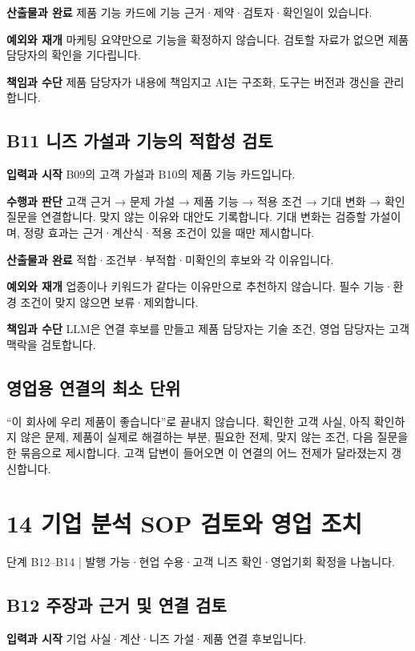 \documentclass[a4paper,10pt]{article}
\begin{document}
\noindent\textbf{산출물과 완료} 제품 기능 카드에 기능 근거·제약·검토자·확인일이 있습니다.


\noindent\textbf{예외와 재개} 마케팅 요약만으로 기능을 확정하지 않습니다. 검토할 자료가 없으면 제품 담당자의 확인을 기다립니다.


\noindent\textbf{책임과 수단} 제품 담당자가 내용에 책임지고 AI는 구조화, 도구는 버전과 갱신을 관리합니다.


\endgroup
\begingroup\setlength{\parskip}{3pt}
\subsection*{B11 니즈 가설과 기능의 적합성 검토}
\noindent\textbf{입력과 시작} B09의 고객 가설과 B10의 제품 기능 카드입니다.


\noindent\textbf{수행과 판단} 고객 근거 → 문제 가설 → 제품 기능 → 적용 조건 → 기대 변화 → 확인 질문을 연결합니다. 맞지 않는 이유와 대안도 기록합니다. 기대 변화는 검증할 가설이며, 정량 효과는 근거·계산식·적용 조건이 있을 때만 제시합니다.


\noindent\textbf{산출물과 완료} 적합·조건부·부적합·미확인의 후보와 각 이유입니다.


\noindent\textbf{예외와 재개} 업종이나 키워드가 같다는 이유만으로 추천하지 않습니다. 필수 기능·환경 조건이 맞지 않으면 보류·제외합니다.


\noindent\textbf{책임과 수단} LLM은 연결 후보를 만들고 제품 담당자는 기술 조건, 영업 담당자는 고객 맥락을 검토합니다.


\endgroup
\subsection*{영업용 연결의 최소 단위}
“이 회사에 우리 제품이 좋습니다”로 끝내지 않습니다. 확인한 고객 사실, 아직 확인하지 않은 문제, 제품이 실제로 해결하는 부분, 필요한 전제, 맞지 않는 조건, 다음 질문을 한 묶음으로 제시합니다. 고객 답변이 들어오면 이 연결의 어느 전제가 달라졌는지 갱신합니다.


\clearpage
\section*{14 기업 분석 SOP 검토와 영업 조치}
단계 B12–B14  |  발행 가능·현업 수용·고객 니즈 확인·영업기회 확정을 나눕니다.


\begingroup\setlength{\parskip}{3pt}
\subsection*{B12 주장과 근거 및 연결 검토}
\noindent\textbf{입력과 시작} 기업 사실·계산·니즈 가설·제품 연결 후보입니다.
\end{document}

